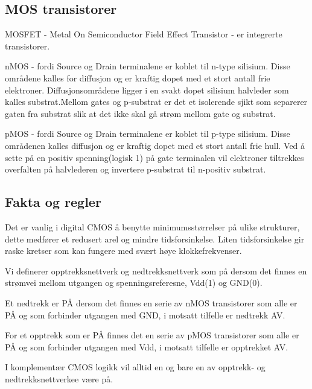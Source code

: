 \documentclass{article}
\begin{document}
	\subsection{MOS transistorer}
	MOSFET - Metal On Semiconductor Field Effect Transistor - er integrerte transistorer.
	
	nMOS - fordi Source og Drain terminalene er koblet til n-type silisium.
	Disse områdene kalles for diffusjon og er kraftig dopet med et stort antall frie elektroner. Diffusjonsområdene ligger i en svakt dopet silisium halvleder som kalles substrat.Mellom gates og p-substrat er det et isolerende sjikt som separerer gaten fra substrat slik at det ikke skal gå strøm mellom gate og substrat.
	
	pMOS - fordi Source og Drain terminalene er koblet til p-type silisium. Disse områdenen kalles diffusjon og er kraftig dopet med et stort antall frie hull. Ved å sette på en positiv spenning(logisk 1) på gate terminalen vil elektroner tiltrekkes overfalten på halvlederen og invertere p-substrat til n-positiv substrat.
	
	\subsection{Fakta og regler}
	
	Det er vanlig i digital CMOS å benytte minimumsstørrelser på ulike strukturer, dette medfører et redusert arel og mindre tidsforsinkelse. Liten tidsforsinkelse gir raske kretser som kan fungere med svært høye klokkefrekvenser.
	
	Vi definerer opptrekksnettverk og nedtrekksnettverk som på dersom det finnes en strømvei mellom utgangen og spenningsreferesne, Vdd(1) og GND(0).
	
	Et nedtrekk er PÅ dersom det finnes en serie av nMOS transistorer som alle er PÅ og som forbinder utgangen med GND, i motsatt tilfelle er nedtrekk AV.
	
	For et opptrekk som er PÅ finnes det en serie av pMOS transistorer som alle er PÅ og som forbinder utgangen med Vdd, i motsatt tilfelle er opptrekket AV.
	
	I komplementær CMOS logikk vil alltid en og bare en av opptrekk- og nedtrekksnettverkee være på.
	
\end{document}
